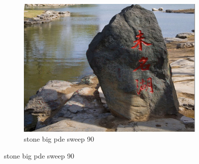 \documentclass[11pt]{article}
\begin{document}
\begin{figure}[ht!]
\begin{subfigure}[]{0.333\linewidth}
        \centering
        \includegraphics[width=\linewidth]{fig/restoration/stone_big/pde_90.jpg}
        \caption{stone big pde sweep 90}
    \end{subfigure}%
\end{figure}
\end{document}
